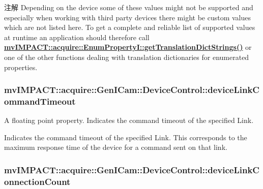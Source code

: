 \begin{DoxyNote}{注解}
Depending on the device some of these values might not be supported and especially when working with third party devices there might be custom values which are not listed here. To get a complete and reliable list of supported values at runtime an application should therefore call {\bfseries \hyperlink{classmv_i_m_p_a_c_t_1_1acquire_1_1_enum_property_i_a0ba6ccbf5ee69784d5d0b537924d26b6}{mv\+I\+M\+P\+A\+C\+T\+::acquire\+::\+Enum\+Property\+I\+::get\+Translation\+Dict\+Strings()}} or one of the other functions dealing with translation dictionaries for enumerated properties. 
\end{DoxyNote}
\hypertarget{classmv_i_m_p_a_c_t_1_1acquire_1_1_gen_i_cam_1_1_device_control_adce2792c1b6e01ef1d14747360829b1b}{
\subsubsection[{device\+Link\+Command\+Timeout}]{ mv\+I\+M\+P\+A\+C\+T\+::acquire\+::\+Gen\+I\+Cam\+::\+Device\+Control\+::device\+Link\+Command\+Timeout}}\label{classmv_i_m_p_a_c_t_1_1acquire_1_1_gen_i_cam_1_1_device_control_adce2792c1b6e01ef1d14747360829b1b}


A floating point property. Indicates the command timeout of the specified Link. 

Indicates the command timeout of the specified Link. This corresponds to the maximum response time of the device for a command sent on that link. \hypertarget{classmv_i_m_p_a_c_t_1_1acquire_1_1_gen_i_cam_1_1_device_control_ad484aba1d95520e246b7712354aaaa47}{
\subsubsection[{device\+Link\+Connection\+Count}]{ mv\+I\+M\+P\+A\+C\+T\+::acquire\+::\+Gen\+I\+Cam\+::\+Device\+Control\+::device\+Link\+Connection\+Count}}\label{classmv_i_m_p_a_c_t_1_1acquire_1_1_gen_i_cam_1_1_device_control_ad484aba1d95520e246b7712354aaaa47}


